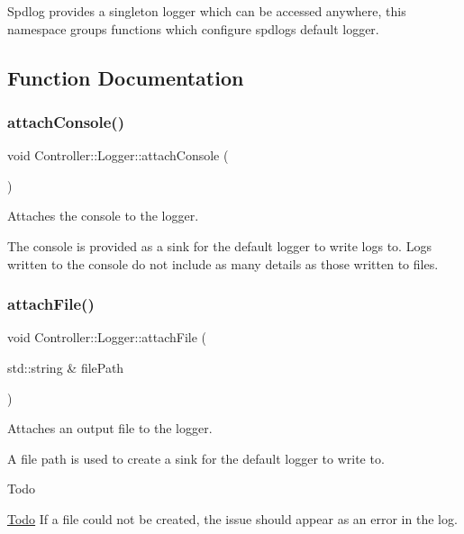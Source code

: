 Spdlog provides a singleton logger which can be accessed anywhere, this namespace groups functions which configure spdlog\textquotesingle{}s default logger. 

\subsection{Function Documentation}
\mbox{\label{namespaceController_1_1Logger_ac59dfc82da6b3803faae8bbab0fba789}} 
\subsubsection{\texorpdfstring{attachConsole()}{attachConsole()}}
{\footnotesize\ttfamily void Controller\+::\+Logger\+::attach\+Console (\begin{DoxyParamCaption}{ }\end{DoxyParamCaption})}



Attaches the console to the logger. 

The console is provided as a sink for the default logger to write logs to. Logs written to the console do not include as many details as those written to files. \mbox{\label{namespaceController_1_1Logger_a30f74b95beb503c15cbca331bf9e229d}} 
\subsubsection{\texorpdfstring{attachFile()}{attachFile()}}
{\footnotesize\ttfamily void Controller\+::\+Logger\+::attach\+File (\begin{DoxyParamCaption}\item[{std\+::string \&}]{file\+Path }\end{DoxyParamCaption})}



Attaches an output file to the logger. 

A file path is used to create a sink for the default logger to write to. \begin{DoxyRefDesc}{Todo}
\item[\mbox{\hyperlink{todo__todo000001}{Todo}}]If a file could not be created, the issue should appear as an error in the log.\end{DoxyRefDesc}



